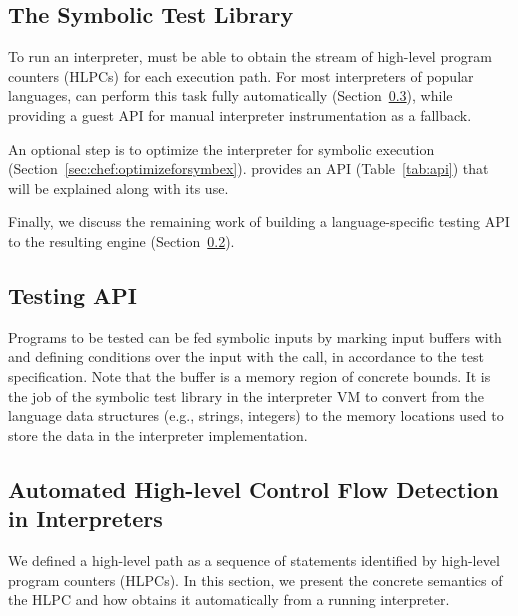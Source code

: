 \subsection{The Symbolic Test Library}


To run an interpreter, \chef must be able to obtain the stream of high-level program counters (HLPCs) for each execution path.  For most interpreters of popular languages, \chef can perform this task fully automatically (Section~\ref{sec:chef:hlcf}), while providing a guest API for manual interpreter instrumentation as a fallback.

An optional step is to optimize the interpreter for symbolic execution (Section~\ref{sec:chef:optimizeforsymbex}).  \chef provides an API (Table~\ref{tab:api}) that will be explained along with its use.

Finally, we discuss the remaining work of building a language-specific testing API to the resulting engine (Section~\ref{sec:chef:testingAPI}).

\subsection{Testing API}
\label{sec:chef:testingAPI}

Programs to be tested can be fed symbolic inputs by marking input buffers with  and defining conditions over the input with the  call, in accordance to the test specification.  Note that the buffer is a memory region of concrete bounds.  It is the job of the symbolic test library in the interpreter VM to convert from the language data structures (e.g., strings, integers) to the memory locations used to store the data in the interpreter implementation.


\subsection{Automated High-level Control Flow Detection in Interpreters}
\label{sec:chef:hlcf}

We defined a high-level path as a sequence of statements identified by high-level program counters (HLPCs).  In this section, we present the concrete semantics of the HLPC and how \chef obtains it automatically from a running interpreter.

